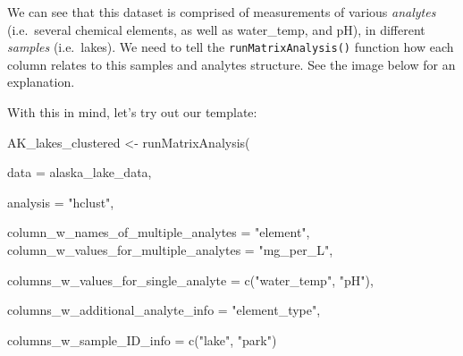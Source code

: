 \documentclass[
]{krantz}
\newenvironment{Shaded}{\begin{snugshade}}{\end{snugshade}}
\newcommand{\AttributeTok}[1]{\textcolor[rgb]{0.77,0.63,0.00}{#1}}
\newcommand{\FunctionTok}[1]{\textcolor[rgb]{0.00,0.00,0.00}{#1}}
\newcommand{\NormalTok}[1]{#1}
\newcommand{\OtherTok}[1]{\textcolor[rgb]{0.56,0.35,0.01}{#1}}
\newcommand{\StringTok}[1]{\textcolor[rgb]{0.31,0.60,0.02}{#1}}
\begin{document}
We can see that this dataset is comprised of measurements of various \emph{analytes} (i.e.~several chemical elements, as well as water\_temp, and pH), in different \emph{samples} (i.e.~lakes). We need to tell the \texttt{runMatrixAnalysis()} function how each column relates to this samples and analytes structure. See the image below for an explanation.

With this in mind, let's try out our template:

\begin{Shaded}
\begin{Highlighting}[]
\NormalTok{AK\_lakes\_clustered }\OtherTok{\textless{}{-}} \FunctionTok{runMatrixAnalysis}\NormalTok{(}
                                
    \AttributeTok{data =}\NormalTok{ alaska\_lake\_data,}

    \AttributeTok{analysis =} \StringTok{"hclust"}\NormalTok{,}

    \AttributeTok{column\_w\_names\_of\_multiple\_analytes =} \StringTok{"element"}\NormalTok{,}
    \AttributeTok{column\_w\_values\_for\_multiple\_analytes =} \StringTok{"mg\_per\_L"}\NormalTok{,}
    
    \AttributeTok{columns\_w\_values\_for\_single\_analyte =} \FunctionTok{c}\NormalTok{(}\StringTok{"water\_temp"}\NormalTok{, }\StringTok{"pH"}\NormalTok{),}
    
    \AttributeTok{columns\_w\_additional\_analyte\_info =} \StringTok{"element\_type"}\NormalTok{,}

    \AttributeTok{columns\_w\_sample\_ID\_info =} \FunctionTok{c}\NormalTok{(}\StringTok{"lake"}\NormalTok{, }\StringTok{"park"}\NormalTok{)}


\end{Highlighting}
\end{Shaded}
\end{document}
